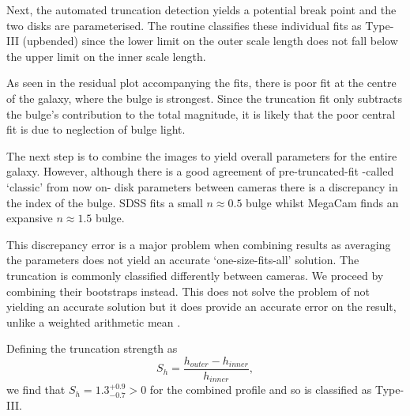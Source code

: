 Next, the automated truncation detection yields a potential break point and the two disks are parameterised. The routine classifies these individual fits as Type-III (upbended) since the lower limit on the outer scale length does not fall below the upper limit on the inner scale length. 

As seen in the residual plot accompanying the fits, there is poor fit at the centre of the galaxy, where the bulge is strongest. Since the truncation fit only subtracts the bulge's contribution to the total magnitude, it is likely that the poor central fit is due to neglection of bulge light.

The next step is to combine the images to yield overall parameters for the entire galaxy. However, although there is a good agreement of pre-truncated-fit -called `classic' from now on- disk parameters between cameras there is a discrepancy in the \sersic index of the bulge. SDSS fits a small $n\approx 0.5$ bulge whilst MegaCam finds an expansive $n\approx 1.5$ bulge. 

This discrepancy error is a major problem when combining results as averaging the parameters does not yield an accurate `one-size-fits-all' solution. The truncation is commonly classified differently between cameras. We proceed by combining their bootstraps instead. This does not solve the problem of not yielding an accurate solution but it does provide an accurate error on the result, unlike a weighted arithmetic mean \citep{andrae_error_2010}. 

Defining the truncation strength as 
\begin{equation}
	S_h =  \frac{h_{outer} - h_{inner}}{h_{inner}},
\end{equation}
we find that $S_h = 1.3^{+0.9}_{-0.7} > 0$ for the combined profile and so is classified as Type-III.


